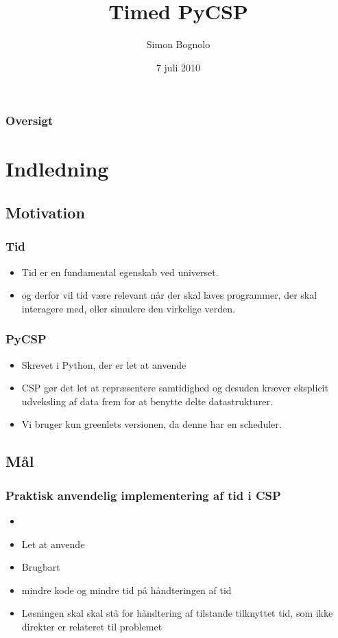 \documentclass[12pt]{beamer}
\title
{Timed PyCSP}
\institute
{Datalogisk Institut \\ Københavns Universitet}
\author
{Simon Bognolo}
\date
{7 juli 2010}
\begin{document}
\frame[plain]\titlepage

\begin{frame}
  \frametitle{Oversigt}
  \tableofcontents
\end{frame}

\section{Indledning}
\subsection{Motivation}
\begin{frame}
  \frametitle{Tid}
  \begin{itemize}
\item Tid er en fundamental egenskab ved universet.
\item og derfor vil tid være relevant når der skal laves programmer, der skal interagere med, eller simulere den virkelige verden.
  \end{itemize}
\end{frame}

\begin{frame}
  \frametitle{PyCSP}
  \begin{itemize}
\item Skrevet i Python, der er let at anvende
\item CSP  gør det let at repræsentere samtidighed og desuden kræver eksplicit udveksling af data frem for at benytte
delte datastrukturer.
\item Vi bruger kun greenlets versionen, da denne har en scheduler.
  \end{itemize}
\end{frame}

\subsection{Mål}
\begin{frame}
  \frametitle{Praktisk anvendelig implementering af tid i CSP}
  \begin{itemize}
	\item 
	\item Let at anvende
	\item Brugbart
	\item mindre kode og mindre tid på håndteringen af tid
	\item Løsningen skal skal stå for håndtering af tilstande tilknyttet tid, som ikke direkter er relateret til problemet
  \end{itemize}
\end{frame}
\end{document}
